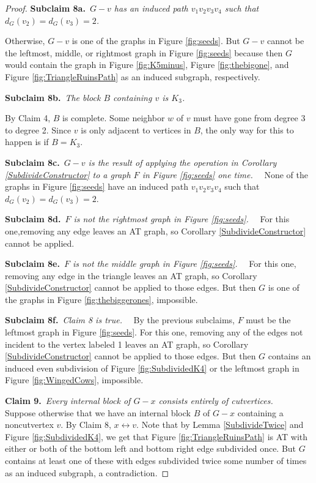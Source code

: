 \documentclass[12pt]{article}
\theoremstyle{plain}
\theoremstyle{definition}
\theoremstyle{remark}
\def\adj{\leftrightarrow}
\newcommand{\claim}[2]{{\bf Claim #1.}~{\it #2}~~}
\newcommand{\subclaim}[2]{{\bf Subclaim #1.}~{\it #2}~~}
\def\adj{\leftrightarrow}
\begin{document}
\begin{proof}
	 \subclaim{8a}{$G-v$ has an induced path $v_1v_2v_3v_4$ such that $d_G(v_2) = d_G(v_3) = 2$.}
	 
	 Otherwise, $G-v$ is one of the graphs in Figure \ref{fig:seeds}.  But $G-v$ cannot be the leftmost, middle, or rightmost graph in Figure \ref{fig:seeds} because then $G$ would contain the graph in Figure \ref{fig:K5minus}, Figure \ref{fig:thebigone}, and Figure \ref{fig:TriangleRuinsPath} as an induced subgraph, respectively.  
	 	 
	 \subclaim{8b}{The block $B$ containing $v$ is $K_3$.}
	 
	 By Claim 4, $B$ is complete. Some neighbor $w$ of $v$ must have gone from degree 3 to degree 2. Since $v$ is only adjacent to vertices in $B$,	 
	 the only way for this to happen is if $B = K_3$.  
	 
	 \subclaim{8c}{$G-v$ is the result of applying the operation in Corollary \ref{SubdivideConstructor} to a graph $F$ in Figure \ref{fig:seeds} one time.}
	 None of the graphs in Figure \ref{fig:seeds} have an induced path $v_1v_2v_3v_4$ such that $d_G(v_2) = d_G(v_3) = 2$.

	 \subclaim{8d}{$F$ is not the rightmost graph in Figure \ref{fig:seeds}.}
	 For this one,removing any edge leaves an AT graph, so Corollary \ref{SubdivideConstructor} cannot be applied.
	
	 \subclaim{8e}{$F$ is not the middle graph in Figure \ref{fig:seeds}.}
 	  For this one, removing any edge in the triangle leaves an AT graph, so Corollary \ref{SubdivideConstructor} cannot be applied to those edges.  But then $G$ is one of the graphs in Figure \ref{fig:thebiggerones}, impossible.
	 
	 \subclaim{8f}{Claim 8 is true.}
	 By the previous subclaims, $F$ must be the leftmost graph in Figure \ref{fig:seeds}. For this one, removing any of the edges not incident to the vertex labeled 1 leaves an AT graph, so Corollary \ref{SubdivideConstructor} cannot be applied to those edges.  But then $G$ contains an induced even subdivision of Figure \ref{fig:SubdividedK4} or the leftmost graph in Figure \ref{fig:WingedCows}, impossible.
	 
	 \claim{9}{Every internal block of $G-x$ consists entirely of cutvertices.}
	 Suppose otherwise that we have an internal block $B$ of $G-x$ containing a noncutvertex $v$.  By Claim 8, $x \adj v$.  Note that by Lemma \ref{SubdivideTwice} and Figure \ref{fig:SubdividedK4}, we get that Figure \ref{fig:TriangleRuinsPath} is AT with either or both of the bottom left and bottom right edge subdivided once.  But $G$ contains at least one of these with edges subdivided twice some number of times as an induced subgraph, a contradiction.
	 

\end{proof}
\end{document}
